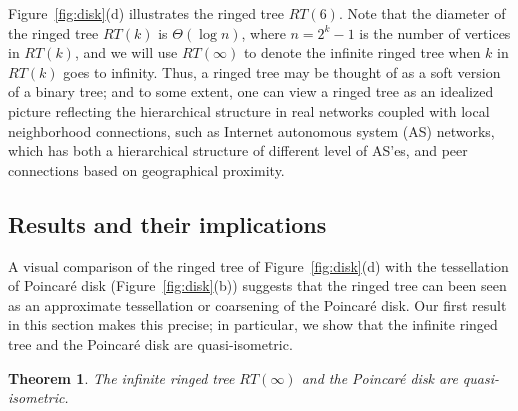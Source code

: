\documentclass[11pt]{article}
\newtheorem{thm}{Theorem}
\begin{document}
\noindent
Figure~\ref{fig:disk}(d) illustrates the ringed tree $RT(6)$.
Note that the diameter of the ringed tree $RT(k)$ is $\Theta(\log n)$, where 
$n=2^k-1$ is the number of vertices in $RT(k)$, and we will use $RT(\infty)$ 
to denote the infinite ringed tree when $k$ in $RT(k)$ goes to infinity.
Thus, a ringed tree may be thought of as a soft version of a binary tree; and 
to some extent, one can view a ringed tree as an idealized 
	picture reflecting the hierarchical
	structure in real networks coupled with local neighborhood connections,
	such as Internet autonomous system (AS) networks, which has both 
	a hierarchical structure of different level of AS'es, and peer connections
	based on geographical proximity. 








\subsection{Results and their implications}
\label{sec:rtresult}

A visual comparison of the ringed tree of Figure~\ref{fig:disk}(d) with
the tessellation of Poincar\'{e} disk (Figure~\ref{fig:disk}(b)) suggests 
that the ringed tree can been seen as an approximate tessellation or 
coarsening of the Poincar\'{e} disk.
Our first result in this section makes this precise; in particular, 
we show that the 
infinite ringed tree and the Poincar\'{e} disk are quasi-isometric.
\begin{thm} \label{thm:isometry}
The infinite ringed tree $RT(\infty)$ and the Poincar\'{e} disk
	are quasi-isometric.
\end{thm}
\end{document}
